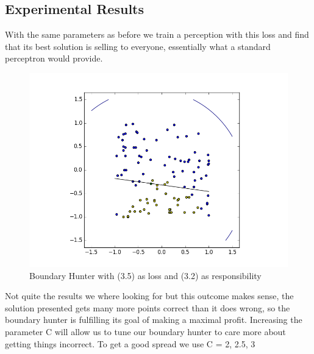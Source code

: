 \documentclass[notitlepage]{report}
\theoremstyle{definition}
\begin{document}
\subsection{Experimental Results}
With the same parameters as before we train a perception with this loss and find that its best solution is selling to everyone, essentially what a standard perceptron would provide.

\begin{figure}[H]
\centering
  \begin{minipage}[b]{0.4\textwidth}
    \includegraphics[width=\textwidth]{BoundaryHunter-Attempt3-01.png}
    \caption{Boundary Hunter with (3.5) as loss and (3.2) as responsibility}
  \end{minipage}
  \hfill
\end{figure}

Not quite the results we where looking for but this outcome makes sense, the solution presented gets many more points correct than it does wrong, so the boundary hunter is fulfilling its goal of making a maximal profit. Increasing the parameter C will allow us to tune our boundary hunter to care more about getting things incorrect. To get a good spread we use C = 2, 2.5, 3
\end{document}
